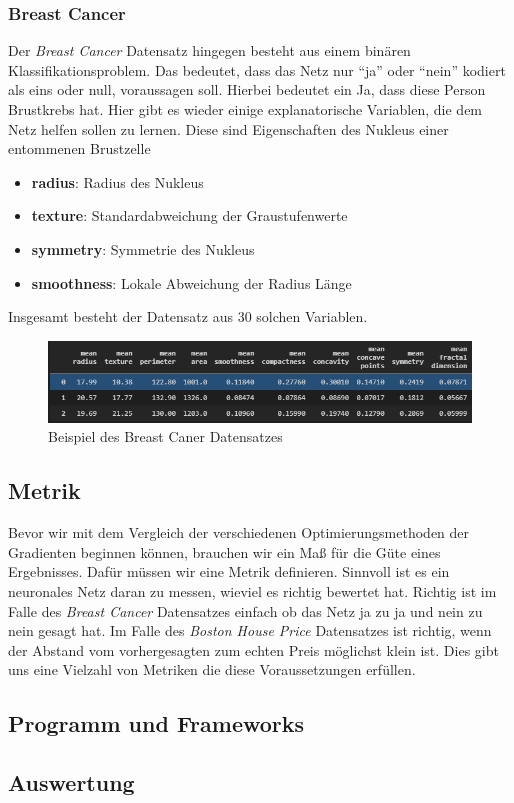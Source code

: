 \subsubsection{Breast Cancer} \label{Breast Cancer}

Der \textit{Breast Cancer} Datensatz hingegen besteht aus einem binären Klassifikationsproblem.
Das bedeutet, dass das Netz nur ``ja'' oder ``nein'' kodiert als eins oder null, voraussagen
soll. Hierbei bedeutet ein Ja, dass diese Person Brustkrebs hat. Hier gibt es 
wieder einige explanatorische Variablen, die dem Netz helfen sollen zu lernen.
Diese sind Eigenschaften des Nukleus einer entommenen Brustzelle


\begin{itemize}
    \item \textbf{radius}: Radius des Nukleus
    \item \textbf{texture}: Standardabweichung der Graustufenwerte
    \item \textbf{symmetry}: Symmetrie des Nukleus
    \item \textbf{smoothness}: Lokale Abweichung der Radius Länge
\end{itemize}

Insgesamt besteht der Datensatz aus 30 solchen Variablen.

\begin{figure}[htbp] 
    \centering
       \includegraphics[width=1.0\textwidth]{abb/BreastCancerBeispiel.PNG}
    \caption{Beispiel des Breast Caner Datensatzes}
    \label{fig:Bild1}
\end{figure}

\subsection{Metrik} \label{Metrik}

Bevor wir mit dem Vergleich der verschiedenen Optimierungsmethoden der Gradienten
beginnen können, brauchen wir ein Maß für die Güte eines Ergebnisses. 
Dafür müssen wir eine Metrik definieren. Sinnvoll ist es ein neuronales Netz
daran zu messen, wieviel es richtig bewertet hat. Richtig ist im Falle des \textit{Breast Cancer}
Datensatzes einfach ob das Netz ja zu ja und nein zu nein gesagt hat. Im Falle 
des \textit{Boston House Price} Datensatzes ist richtig, wenn der Abstand vom
vorhergesagten zum echten Preis möglichst klein ist. Dies gibt uns eine 
Vielzahl von Metriken die diese Voraussetzungen erfüllen.  


\subsection{Programm und Frameworks} \label{Programm und Frameworks}

\subsection{Auswertung} \label{Auswertung}

